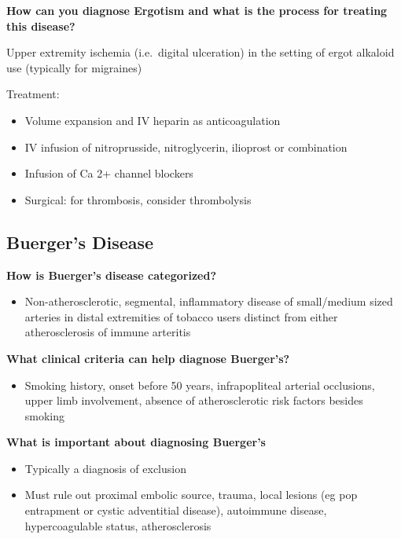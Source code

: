 \documentclass[
]{book}
\providecommand{\tightlist}{%
  \setlength{\itemsep}{0pt}\setlength{\parskip}{0pt}}
\begin{document}
\textbf{How can you diagnose Ergotism and what is the process for treating
this disease?}

Upper extremity ischemia (i.e.~digital ulceration) in the setting of
ergot alkaloid use (typically for migraines)~

Treatment:~

\begin{itemize}
\item
  Volume expansion and IV heparin as anticoagulation~
\item
  IV infusion of nitroprusside, nitroglycerin, ilioprost or
  combination
\item
  Infusion of Ca 2+ channel blockers~
\item
  Surgical: for thrombosis, consider thrombolysis~
\end{itemize}

\hypertarget{buergers-disease}{%
\subsection{\texorpdfstring{\textbf{Buerger's Disease}}{Buerger's Disease}}\label{buergers-disease}}

\textbf{How is Buerger's disease categorized?}
\citet{jacklcronenwettVascularDecisionMaking2020}

\begin{itemize}
\tightlist
\item
  Non-atherosclerotic, segmental, inflammatory disease of small/medium
  sized arteries in distal extremities of tobacco users distinct from
  either atherosclerosis of immune arteritis
\end{itemize}

\textbf{What clinical criteria can help diagnose Buerger's?}

\begin{itemize}
\tightlist
\item
  Smoking history, onset before 50 years, infrapopliteal arterial
  occlusions, upper limb involvement, absence of atherosclerotic risk
  factors besides smoking
\end{itemize}

\textbf{What is important about diagnosing Buerger's}

\begin{itemize}
\item
  Typically a diagnosis of exclusion
\item
  Must rule out proximal embolic source, trauma, local lesions (eg pop
  entrapment or cystic adventitial disease), autoimmune disease,
  hypercoagulable status, atherosclerosis
\end{itemize}
\end{document}
